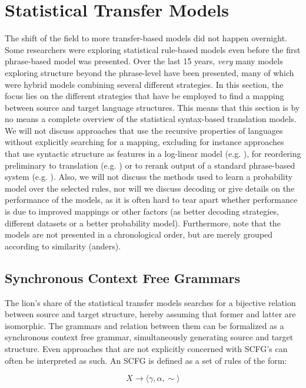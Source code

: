 \documentclass{report}
\theoremstyle{definition}
\theoremstyle{plain}
\begin{document}
\section{Statistical Transfer Models}

The shift of the field to more transfer-based models did not happen overnight. Some researchers were exploring statistical rule-based models even before the first phrase-based model was presented. Over the last 15 years, \textit{very} many models exploring structure beyond the phrase-level have been presented, many of which were hybrid models combining several different strategies. In this section, the focus lies on the different strategies that have be employed to find a mapping between source and target language structures. This means that this section is by no means a complete overview of the statistical syntax-based translation models. We will not discuss approaches that use the recursive properties of languages without explicitly searching for a mapping, excluding for instance approaches that use syntactic structure as features in a log-linear model (e.g. \cite{cherry2013improved,liu2010semantic}), for reordering preliminary to translation (e.g. \cite{khalilov2012statistical}) or to rerank output of a standard phrase-based system (e.g. \cite{och2004smorgasbord}). Also, we will not discuss the methods used to learn a probability model over the selected rules, nor will we discuss decoding or give details on the performance of the models, as it is often hard to tear apart whether performance is due to improved mappings or other factors (as better decoding strategies, different datasets or a better probability model). Furthermore, note that the models are not presented in a chronological order, but are merely grouped according to similarity (anders).

\subsection{Synchronous Context Free Grammars}
The lion's share of the statistical transfer models searches for a bijective relation between source and target structure, hereby assuming that former and latter are isomorphic. The grammars and relation between them can be formalized as a synchronous context free grammar, simultaneously generating source and target structure. Even approaches that are not explicitly concerned with SCFG's can often be interpreted as such. An SCFG is defined as a set of rules of the form:

\[
X \to \langle \gamma , \alpha , \sim \rangle
\]
\end{document}
